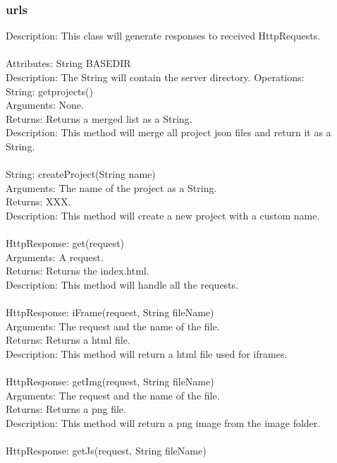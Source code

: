 \documentclass[12pt]{extarticle}
\begin{document}
\subsubsection{urls}
Description: This class will generate responses to received HttpRequests. \\ \\
Attributes:
    String BASE\textunderscore DIR \\
    Description: The String will contain the server directory.
Operations: \\
	String: get\textunderscore projects() \\
    Arguments: None. \\
	Returns: Returns a merged list as a String. \\
	Description: This method will merge all project json files and return it as a String. \\ \\
	String: createProject(String name) \\
    Arguments: The name of the project as a String. \\
	Returns: XXX. \\
	Description: This method will create a new project with a custom name. \\ \\
	HttpResponse: get(request) \\
    Arguments: A request. \\
	Returns: Returns the index.html. \\
	Description: This method will handle all the requests. \\ \\
	HttpResponse: iFrame(request, String fileName) \\
    Arguments: The request and the name of the file. \\
	Returns: Returns a html file. \\
	Description: This method will return a html file used for iframes. \\ \\
	HttpResponse: getImg(request, String fileName) \\
    Arguments: The request and the name of the file. \\
	Returns: Returns a png file. \\
	Description: This method will return a png image from the image folder. \\ \\
	HttpResponse: getJs(request, String fileName) \\
\end{document}
